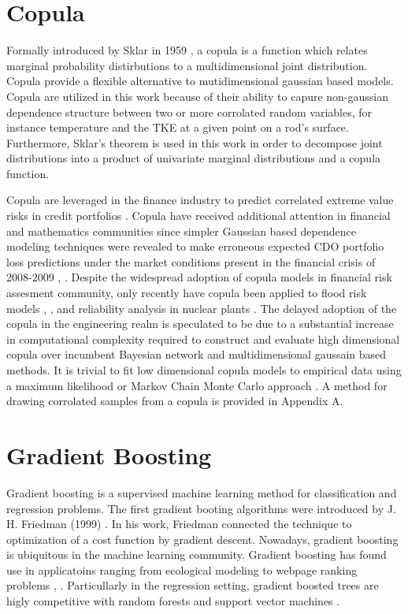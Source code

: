 \section{Copula}

Formally introduced by Sklar in 1959 \cite{Sklar1959}, a copula is a function which relates marginal probability distirbutions to a multidimensional joint distribution.  Copula provide a flexible alternative to mutidimensional gaussian based models.  Copula are utilized in this work because of their ability to capure non-gaussian dependence structure between two or more corrolated random variables, for instance temperature and the TKE at a given point on a rod's surface.  Furthermore, Sklar's theorem is used in this work in order to decompose joint distributions into a product of univariate marginal distributions and a copula function.  

Copula are leveraged in the finance industry to
predict correlated extreme value risks in credit portfolios
\cite{Geidosch2016}.  Copula have received additional attention in financial and mathematics communities since 
simpler Gaussian based dependence modeling techniques were revealed to make erroneous expected CDO portfolio loss predictions under the market conditions present in the financial crisis of
2008-2009 \cite{MacKenzie2013}, \cite{Li2000}.  Despite the widespread adoption of copula models in financial risk assesment community, only recently have copula been applied to flood risk
models \cite{Dupuis2007}, \cite{Ganguli2012}, and reliability analysis in nuclear plants
\cite{Kelly2007}.  The delayed adoption of the copula in the
engineering realm is speculated to be due to a substantial increase in computational
complexity required to construct and evaluate high dimensional copula over
incumbent Bayesian network and multidimensional gaussain based methods.  
It is trivial to fit low dimensional copula models to empirical data
using a maximum likelihood or Markov Chain Monte Carlo approach \cite{Jouini1996}.
A method for drawing corrolated samples from a copula is provided in Appendix A.

\section{Gradient Boosting}

Gradient boosting is a supervised machine learning method for classification and regression problems.
The first gradient booting algorithms were introduced by J. H. Friedman (1999) \cite{friedman2001}.  In his work, Friedman connected the technique to optimization of a cost function by gradient descent.
Nowadays, gradient boosting is ubiquitous in the machine learning community.  Gradient boosting has found use in applicatoins ranging from ecological modeling \cite{death2007} to webpage ranking problems \cite{Tyree2011}, \cite{chapelle2011}.  Particullarly in the regression setting, gradient boosted trees are higly competitive with random forests and support vector machines \cite{moisen2006}. 

